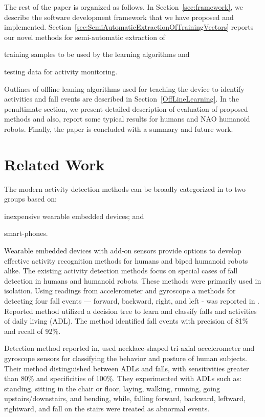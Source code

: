 \documentclass{IEEEtran}
\begin{document}
The rest of the paper is organized as follows. In Section~\ref{sec:framework}, we describe the software development 
framework that we have proposed and implemented.
Section~\ref{sec:SemiAutomaticExtractionOfTrainingVectors} reports our novel methods for  semi-automatic extraction  of \begin{inparaenum} [($i$)] \item training samples to be used by the learning algorithms  and \item testing data for activity monitoring. \end{inparaenum} Outlines of offline leaning algorithms used for teaching the device to identify activities and fall events are described in Section~\ref{OffLineLearning}. 
 In the penultimate section, we present detailed description of evaluation of proposed methods and also, report some typical results for humans and NAO humanoid 
robots. 
Finally, the paper is concluded with a summary and future work.  

\section{Related Work}
\label{subSec:relatedWork}

The modern activity detection methods can be broadly categorized in to two groups based on: 
\begin{inparaenum}[($i$)] \item inexpensive wearable embedded devices; and \item smart-phones. 
\end{inparaenum} Wearable embedded devices with add-on sensors provide options to develop effective 
activity recognition methods for humans and biped humanoid robots alike. The existing activity 
detection methods focus on special cases of fall detection in humans and humanoid robots. These 
methods were primarily used in isolation.  Using readings from accelerometer and gyroscope a methods for detecting four fall events --- forward, backward, right, and left - was reported in \cite{ojetolaFallDetection2011}.  Reported method utilized  a decision tree to 
learn and classify falls and activities of daily living (ADL). The method identified fall events 
with precision of 81\%  and recall of 92\%. 

Detection method reported in\cite{baekFallDetection2013}, used necklace-shaped tri-axial
accelerometer  and  gyroscope  sensors  for classifying  the  behavior  and  posture  of  human
 subjects. Their method distinguished between  ADLs and  falls, with  sensitivities  greater  than 
 80\%  and specificities  of  100\%. They experimented with ADLs such as: standing, sitting in the 
 chair or floor, laying, walking, running, going upstairs/downstairs, and bending, while, 
 falling forward, backward, leftward, rightward, and fall on the stairs were treated as abnormal 
 events. 
 
\end{document}

